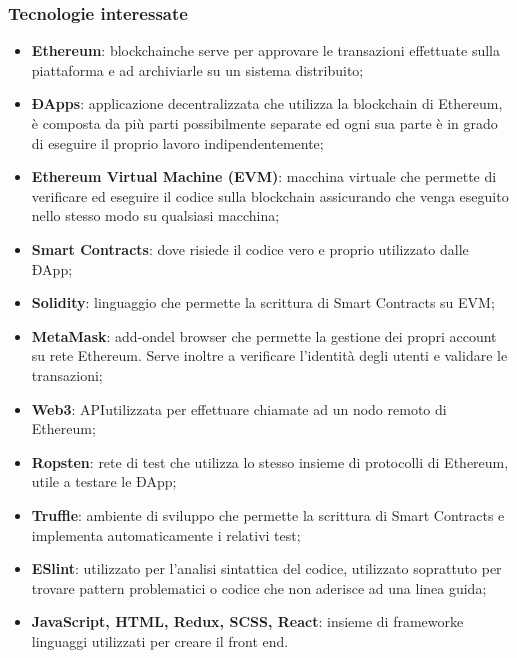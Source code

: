 \subsubsection{Tecnologie interessate}
\begin{itemize}
	\item \textbf{Ethereum}\glo: blockchain\glosp che serve per approvare le transazioni effettuate sulla piattaforma e ad archiviarle su un sistema distribuito; 
	\item \textbf{ÐApps}\glo: applicazione decentralizzata che utilizza la blockchain di Ethereum, è composta da più parti possibilmente separate ed ogni sua parte è in grado di eseguire il proprio lavoro indipendentemente; 
	\item \textbf{Ethereum Virtual Machine (EVM)}: macchina virtuale che permette di verificare ed eseguire il codice sulla blockchain assicurando che venga eseguito nello stesso modo su qualsiasi macchina;
	\item \textbf{Smart Contracts}\glo: dove risiede il codice vero e proprio utilizzato dalle ÐApp;
	\item \textbf{Solidity}: linguaggio che permette la scrittura di Smart Contracts su EVM;
	\item \textbf{MetaMask}\glo: add-on\glosp del browser che permette la gestione dei propri account su rete Ethereum. Serve inoltre a verificare l'identità degli utenti e validare le transazioni;
	\item \textbf{Web3}: API\glosp utilizzata per effettuare chiamate ad un nodo remoto di Ethereum;
	\item\textbf{Ropsten}: rete di test che utilizza lo stesso insieme di protocolli di Ethereum, utile a testare le ÐApp;
	\item\textbf{Truffle}: ambiente di sviluppo che permette la scrittura di Smart Contracts e implementa automaticamente i relativi test;
	\item\textbf{ESlint\glo}: utilizzato per l'analisi sintattica del codice, utilizzato soprattuto per trovare pattern problematici o codice che non aderisce ad una linea guida;
	\item \textbf{JavaScript, HTML, Redux\glo, SCSS\glo, React\glo}: insieme di framework\glosp e linguaggi utilizzati per creare il front end\glo.
\end{itemize}

